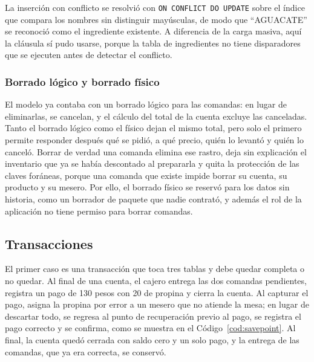 La inserción con conflicto se resolvió con \texttt{ON CONFLICT DO UPDATE} sobre el índice que compara los nombres sin distinguir mayúsculas, de modo que \enquote{AGUACATE} se reconoció como el ingrediente existente. A diferencia de la carga masiva, aquí la cláusula sí pudo usarse, porque la tabla de ingredientes no tiene disparadores que se ejecuten antes de detectar el conflicto.

\subsubsection{Borrado lógico y borrado físico}

El modelo ya contaba con un borrado lógico para las comandas: en lugar de eliminarlas, se cancelan, y el cálculo del total de la cuenta excluye las canceladas. Tanto el borrado lógico como el físico dejan el mismo total, pero solo el primero permite responder después qué se pidió, a qué precio, quién lo levantó y quién lo canceló. Borrar de verdad una comanda elimina ese rastro, deja sin explicación el inventario que ya se había descontado al prepararla y quita la protección de las claves foráneas, porque una comanda que existe impide borrar su cuenta, su producto y su mesero. Por ello, el borrado físico se reservó para los datos sin historia, como un borrador de paquete que nadie contrató, y además el rol de la aplicación no tiene permiso para borrar comandas.

\subsection{Transacciones}

El primer caso es una transacción que toca tres tablas y debe quedar completa o no quedar. Al final de una cuenta, el cajero entrega las dos comandas pendientes, registra un pago de 130 pesos con 20 de propina y cierra la cuenta. Al capturar el pago, asigna la propina por error a un mesero que no atiende la mesa; en lugar de descartar todo, se regresa al punto de recuperación previo al pago, se registra el pago correcto y se confirma, como se muestra en el Código~\ref{cod:savepoint}. Al final, la cuenta quedó cerrada con saldo cero y un solo pago, y la entrega de las comandas, que ya era correcta, se conservó.

